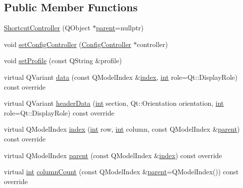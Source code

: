\subsection*{Public Member Functions}
\begin{DoxyCompactItemize}
\item 
\mbox{\hyperlink{class_q_g_b_a_1_1_shortcut_controller_a5b11018e05f2330e6cdfef8092a9e625}{Shortcut\+Controller}} (Q\+Object $\ast$\mbox{\hyperlink{class_q_g_b_a_1_1_shortcut_controller_a03dfea8451c656378e1fb81faf4843ca}{parent}}=nullptr)
\item 
void \mbox{\hyperlink{class_q_g_b_a_1_1_shortcut_controller_a67a2b7ce2e4d61339b64278144fc3156}{set\+Config\+Controller}} (\mbox{\hyperlink{class_q_g_b_a_1_1_config_controller}{Config\+Controller}} $\ast$controller)
\item 
void \mbox{\hyperlink{class_q_g_b_a_1_1_shortcut_controller_a69946ee1097285bd64477642dc6be7fd}{set\+Profile}} (const Q\+String \&profile)
\item 
virtual Q\+Variant \mbox{\hyperlink{class_q_g_b_a_1_1_shortcut_controller_aaca86abde672cfa640bb16c2f18be31a}{data}} (const Q\+Model\+Index \&\mbox{\hyperlink{class_q_g_b_a_1_1_shortcut_controller_ae75cb760bb05d9e1e20b8f1080884cbd}{index}}, \mbox{\hyperlink{ioapi_8h_a787fa3cf048117ba7123753c1e74fcd6}{int}} role=Qt\+::\+Display\+Role) const override
\item 
virtual Q\+Variant \mbox{\hyperlink{class_q_g_b_a_1_1_shortcut_controller_a1036c8c0846dfa5b2ccb43593ac71ac5}{header\+Data}} (\mbox{\hyperlink{ioapi_8h_a787fa3cf048117ba7123753c1e74fcd6}{int}} section, Qt\+::\+Orientation orientation, \mbox{\hyperlink{ioapi_8h_a787fa3cf048117ba7123753c1e74fcd6}{int}} role=Qt\+::\+Display\+Role) const override
\item 
virtual Q\+Model\+Index \mbox{\hyperlink{class_q_g_b_a_1_1_shortcut_controller_ae75cb760bb05d9e1e20b8f1080884cbd}{index}} (\mbox{\hyperlink{ioapi_8h_a787fa3cf048117ba7123753c1e74fcd6}{int}} row, \mbox{\hyperlink{ioapi_8h_a787fa3cf048117ba7123753c1e74fcd6}{int}} column, const Q\+Model\+Index \&\mbox{\hyperlink{class_q_g_b_a_1_1_shortcut_controller_a03dfea8451c656378e1fb81faf4843ca}{parent}}) const override
\item 
virtual Q\+Model\+Index \mbox{\hyperlink{class_q_g_b_a_1_1_shortcut_controller_a03dfea8451c656378e1fb81faf4843ca}{parent}} (const Q\+Model\+Index \&\mbox{\hyperlink{class_q_g_b_a_1_1_shortcut_controller_ae75cb760bb05d9e1e20b8f1080884cbd}{index}}) const override
\item 
virtual \mbox{\hyperlink{ioapi_8h_a787fa3cf048117ba7123753c1e74fcd6}{int}} \mbox{\hyperlink{class_q_g_b_a_1_1_shortcut_controller_a6bd58667e538043fe71a6921ce38559a}{column\+Count}} (const Q\+Model\+Index \&\mbox{\hyperlink{class_q_g_b_a_1_1_shortcut_controller_a03dfea8451c656378e1fb81faf4843ca}{parent}}=Q\+Model\+Index()) const override

\end{DoxyCompactItemize}
